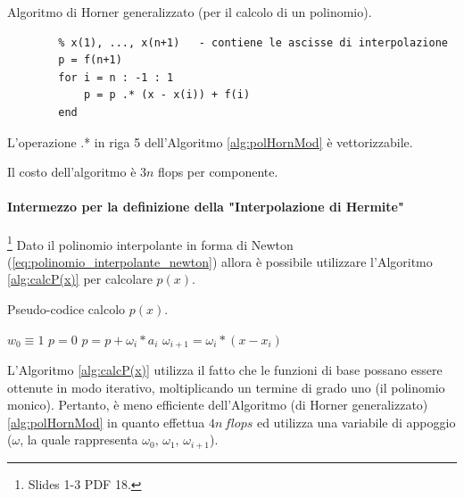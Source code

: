 \begin{algorithm}
\caption{Algoritmo di Horner generalizzato (per il calcolo di un polinomio).}\label{alg:polHornMod}
    \begin{lstlisting}[style=Matlab-editor]
        % f(1), ..., f(n+1)   - calcolato dal codice precedente per le differenze divise
        % x(1), ..., x(n+1)   - contiene le ascisse di interpolazione
        p = f(n+1) 
        for i = n : -1 : 1
            p = p .* (x - x(i)) + f(i)
        end
    \end{lstlisting}
\end{algorithm}

\begin{remark}
    L'operazione .* in riga 5 dell'Algoritmo \ref{alg:polHornMod} è vettorizzabile.
\end{remark}

\begin{remark}
    Il costo dell'algoritmo è $3n$ flops per componente.
\end{remark}

\paragraph{Intermezzo per la definizione della "Interpolazione di Hermite"}\footnote{Slides 1-3 PDF 18.} Dato il polinomio interpolante in forma di Newton (\ref{eq:polinomio_interpolante_newton}) allora è possibile utilizzare l'Algoritmo \ref{alg:calcP(x)} per calcolare $p(x)$.

\begin{algorithm}\caption{Pseudo-codice calcolo $p(x)$.}\label{alg:calcP(x)}
    \begin{algorithmic}
        \State $w_0\equiv 1$
        \State $p = 0$
            \State $p = p + \omega_i * a_i$
            \State $\omega_{i+1} = \omega_i *(x - x_i)$
        \EndFor
    \end{algorithmic}
\end{algorithm}

L'Algoritmo \ref{alg:calcP(x)} utilizza il fatto che le funzioni di base possano essere ottenute in modo iterativo, moltiplicando un termine di grado uno (il polinomio monico). Pertanto, è meno efficiente dell'Algoritmo (di Horner generalizzato) \ref{alg:polHornMod} in quanto effettua $4n\, flops$ ed utilizza una variabile di appoggio ($\omega$, la quale rappresenta $\omega_0,\,\omega_1,\,\omega_{i+1}$).

